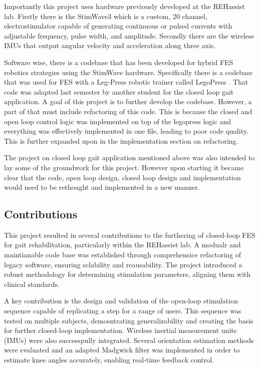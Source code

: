 Importantly this project uses hardware previously developed at the REHassist lab. Firstly there is the StimWave3 which is a custom, 20 channel, electrostimulator capable of generating continuous or pulsed currents with adjustable frequency, pulse width, and amplitude. Secondly there are the wireless IMUs that output angular velocity and acceleration along three axis. 

Software wise, there is a codebase that has been developed for hybrid FES robotics strategies using the StimWave hardware. Specifically there is a codebase that was used for FES with a Leg-Press robotic trainer called LegoPress \cite{olivier_legopress_2014}. That code was adapted last semester by another student for the closed loop gait application. A goal of this project is to further develop the codebase. However, a part of that must include refactoring of this code. This is because the closed and open loop control logic was implemented on top of the legopress logic and everything was effectively implemented in one file, leading to poor code quality. This is further expanded upon in the implementation section on refactoring.

The project on closed loop gait application mentioned above was also intended to lay some of the groundwork for this project. However upon starting it became clear that the code, open loop design, closed loop design and implementation would need to be rethought and implemented in a new manner.



\subsection{Contributions}
This project resulted in several contributions to the furthering of closed-loop FES for gait rehabilitation, particularly within the REHassist lab. A modualr and maintianable code base was established through comprehensice refactoring of legacy software, ensuring sclability and reausability. The project introduced a robust methodology for determining stimulation parameters, aligning them with clinical standards.

A key contribution is the design and validation of the open-loop stimulation sequence capable of replicating a step for a range of users. This sequence was tested on multiple subjects, demosntrating generalizability and creating the basis for further closed-loop implementation. Wireless inertial measurement units (IMUs) were also successpully integrated. Several orientation estimation methods were evaluated and an adapted Madgwick filter was implemented in order to estimate knee angles accurately, enabling real-time feedback control.

